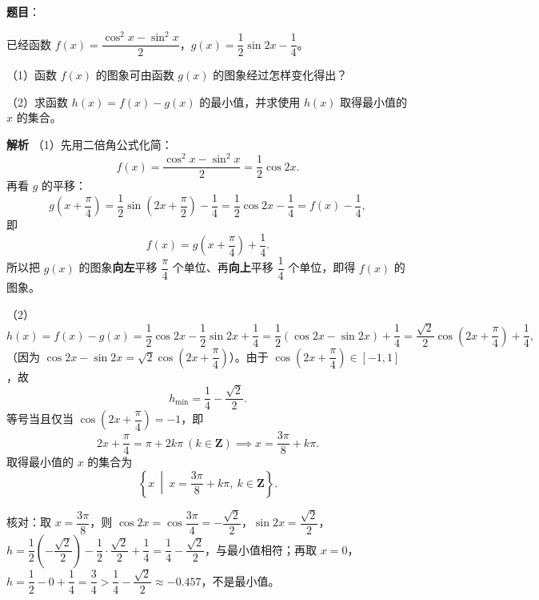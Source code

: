 \begin{answer}

\textbf{题目}：

已经函数 $f(x)=\dfrac{\cos^2x-\sin^2x}{2}$，$g(x)=\dfrac12\sin2x-\dfrac14$。

（1）函数 $f(x)$ 的图象可由函数 $g(x)$ 的图象经过怎样变化得出？

（2）求函数 $h(x)=f(x)-g(x)$ 的最小值，并求使用 $h(x)$ 取得最小值的 $x$ 的集合。

\textbf{解析}
（1）先用二倍角公式化简：
\nopagebreak[4]
\[f(x)=\frac{\cos^2x-\sin^2x}{2}=\frac12\cos2x.\]
再看 $g$ 的平移：
\nopagebreak[4]
\[g\left(x+\frac\pi4\right)=\frac12\sin\left(2x+\frac\pi2\right)-\frac14=\frac12\cos2x-\frac14=f(x)-\frac14,\]
即
\nopagebreak[4]
\[f(x)=g\left(x+\frac{\pi}{4}\right)+\frac14.\]
所以把 $g(x)$ 的图象\textbf{向左}平移 $\dfrac{\pi}{4}$ 个单位、再\textbf{向上}平移 $\dfrac14$ 个单位，即得 $f(x)$ 的图象。

（2）
\nopagebreak[4]
\[h(x)=f(x)-g(x)=\frac12\cos2x-\frac12\sin2x+\frac14
=\frac12\left(\cos2x-\sin2x\right)+\frac14
=\frac{\sqrt2}{2}\cos\left(2x+\frac{\pi}{4}\right)+\frac14,\]
（因为 $\cos2x-\sin2x=\sqrt2\cos\left(2x+\dfrac\pi4\right)$）。由于 $\cos\left(2x+\dfrac\pi4\right)\in[-1,1]$，故
\nopagebreak[4]
\[h_{\min}=\frac14-\frac{\sqrt2}{2}.\]
等号当且仅当 $\cos\left(2x+\dfrac\pi4\right)=-1$，即
\nopagebreak[4]
\[2x+\frac\pi4=\pi+2k\pi\ (k\in\mathbf Z)\implies x=\frac{3\pi}{8}+k\pi.\]
取得最小值的 $x$ 的集合为
\nopagebreak[4]
\[\left\{x\ \middle|\ x=\frac{3\pi}{8}+k\pi,\ k\in\mathbf Z\right\}.\]

核对：取 $x=\dfrac{3\pi}{8}$，则 $\cos2x=\cos\dfrac{3\pi}{4}=-\dfrac{\sqrt2}{2}$，$\sin2x=\dfrac{\sqrt2}{2}$，$h=\dfrac12\left(-\dfrac{\sqrt2}{2}\right)-\dfrac12\cdot\dfrac{\sqrt2}{2}+\dfrac14=\dfrac14-\dfrac{\sqrt2}{2}$，与最小值相符；再取 $x=0$，$h=\dfrac12-0+\dfrac14=\dfrac34>\dfrac14-\dfrac{\sqrt2}{2}\approx-0.457$，不是最小值。


\end{answer}
